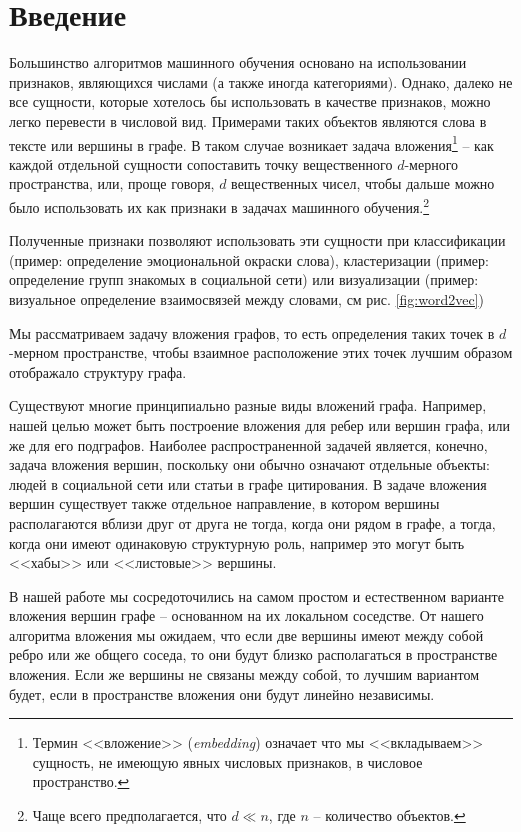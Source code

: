 \documentclass[12pt,a4paper]{extarticle}
\begin{document}
    \setcounter{page}{2}

    \tableofcontents

    \newpage

    \section{Введение}
    Большинство алгоритмов машинного обучения основано на использовании
    признаков, являющихся числами (а также иногда категориями).
    Однако, далеко не все сущности, которые хотелось бы использовать в качестве признаков,
    можно легко перевести в числовой вид.
    Примерами таких объектов являются слова в тексте или вершины в графе.
    В таком случае возникает задача вложения\footnote{Термин <<вложение>> (\textit{embedding}) означает что мы <<вкладываем>> сущность, не имеющую явных числовых признаков, в числовое пространство.} -- как каждой отдельной сущности сопоставить точку вещественного $d$-мерного пространства,
    или, проще говоря, $d$ вещественных чисел, чтобы дальше можно было использовать их как признаки в задачах машинного обучения.\footnote{Чаще всего предполагается, что $d \ll n$, где $n$ -- количество объектов.}
    
    Полученные признаки позволяют использовать эти сущности при классификации (пример: определение эмоциональной окраски слова), кластеризации (пример: определение групп знакомых в социальной сети) или визуализации (пример: визуальное определение взаимосвязей между словами, см рис. \ref{fig:word2vec})
    
    Мы рассматриваем задачу вложения графов, то есть определения таких точек в $d$-мерном пространстве, чтобы взаимное расположение этих точек лучшим образом отображало структуру графа.
    
    Существуют многие принципиально разные виды вложений графа.
    Например, нашей целью может быть построение вложения для ребер или вершин графа, или же для его подграфов.
    Наиболее распространенной задачей является, конечно, задача вложения вершин, поскольку они обычно означают отдельные объекты: людей в социальной сети или статьи в графе цитирования.
    В задаче вложения вершин существует также отдельное направление, в котором вершины располагаются вблизи друг от друга не тогда, когда они рядом в графе, а тогда, когда они имеют одинаковую структурную роль, например это могут быть <<хабы>> или <<листовые>> вершины.
    
    В нашей работе мы сосредоточились на самом простом и естественном варианте вложения вершин графе -- основанном на их локальном соседстве.
    От нашего алгоритма вложения мы ожидаем, что если две вершины имеют между собой ребро или же общего соседа, то они будут близко располагаться в пространстве вложения.
    Если же вершины не связаны между собой, то лучшим вариантом будет, если в пространстве вложения они будут линейно независимы.
    
\end{document}
